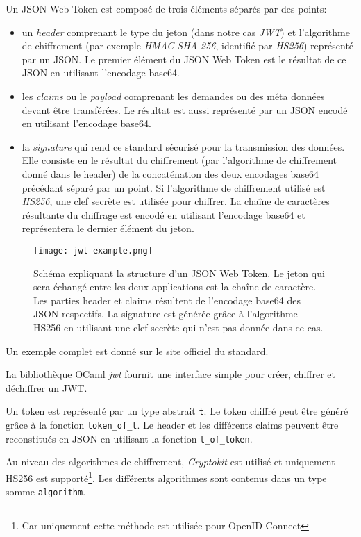 Un JSON Web Token est composé de trois éléments séparés par des points:
\begin{itemize}
  \item un \textit{header} comprenant le type du jeton (dans notre cas
    \emph{JWT}) et l'algorithme de chiffrement (par exemple
    \emph{HMAC-SHA-256}, identifié par \emph{HS256})
    représenté par un JSON. Le premier élément du JSON Web Token est le
    résultat de ce JSON en utilisant l'encodage base64\cite{rfc-base64}.
  \item les \textit{claims} ou le \textit{payload} comprenant les demandes ou
    des méta données devant être transférées. Le résultat est aussi représenté
    par un JSON encodé en utilisant l'encodage base64.
  \item la \textit{signature} qui rend ce standard sécurisé pour la transmission
    des données. Elle consiste en le résultat du chiffrement (par l'algorithme de
    chiffrement donné dans le header) de la concaténation
    des deux encodages base64 précédant séparé par un point. Si l'algorithme de
    chiffrement utilisé est \emph{HS256}, une clef secrète est utilisée pour
    chiffrer. La chaîne de caractères résultante du chiffrage est encodé en
    utilisant l'encodage base64 et représentera le dernier élément du jeton.
\end{itemize}

\begin{figure}
  \centering
  \texttt{[image: jwt-example.png]}
  \caption{Schéma expliquant la structure d'un JSON Web Token. Le jeton qui sera
    échangé entre les deux applications est la chaîne de caractère. Les parties header
    et claims résultent de l'encodage base64 des JSON respectifs. La signature
    est générée grâce à l'algorithme HS256 en utilisant une clef secrète qui
    n'est pas donnée dans ce cas.}
\end{figure}

Un exemple complet est donné sur le site officiel du standard.\cite{official-jwt-website}

La bibliothèque OCaml \emph{jwt}\cite{ocaml-jwt-github} fournit une interface
simple pour créer, chiffrer et déchiffrer un JWT.

Un token est représenté par un type abstrait \verb|t|. Le token chiffré peut
être généré grâce à la fonction \verb|token_of_t|. Le header et les différents
claims peuvent être reconstitués en JSON en utilisant la fonction
\verb|t_of_token|.

Au niveau des algorithmes de chiffrement,
\textit{Cryptokit}\cite{ocaml-cryptokit-ocaml-forge} est utilisé et uniquement
HS256 est supporté\footnote{Car uniquement cette méthode est utilisée pour OpenID
  Connect}. Les différents algorithmes sont contenus dans un type somme \verb|algorithm|.

